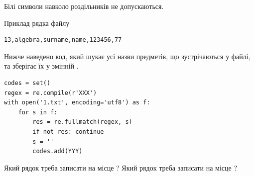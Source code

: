 \documentclass[12pt, ukrainian]{article}
\begin{document}
{Білі символи навколо роздільників не допускаються.

Приклад рядка файлу



\begin{verbatim}
13,algebra,surname,name,123456,77
\end{verbatim}


Нижче наведено код, який шукає усі назви предметів, що зустрічаються у файлі, та зберігає їх у змінній .



\begin{verbatim}
codes = set()
regex = re.compile(r'XXX')
with open('1.txt', encoding='utf8') as f:
    for s in f:
        res = re.fullmatch(regex, s)
        if not res: continue
        s = ''
        codes.add(YYY)
\end{verbatim}



Який рядок треба записати на місце  ?
Який рядок треба записати на місце  ?\par

}
\newpage
\end{document}
